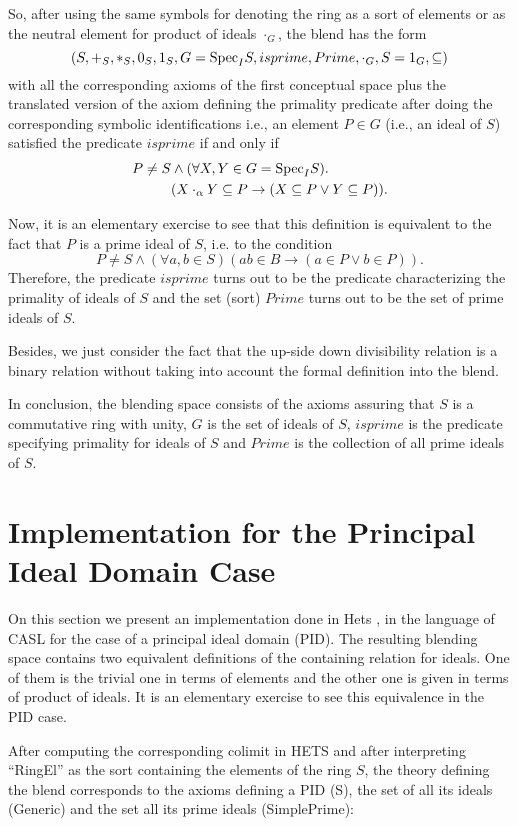 So, after using the same symbols for denoting the ring as a sort of elements or as the neutral element for product of ideals $\cdot_G$, the blend has the form
\[(S, +_S, *_S, 0_S, 1_S, G={\rm Spec}_IS, isprime, Prime, \cdot_G,
S=1_G, \subseteq)\] with all the corresponding axioms of the first
conceptual space plus the translated version of the axiom defining the
primality predicate after doing the corresponding symbolic
identifications i.e., an element $P \in G$ (i.e., an ideal of $S$)
satisfied the predicate $isprime$ if and only if
\begin{align*}
P\neq S & \wedge (\forall X,Y\in G={\rm Spec}_IS). \\
        & (X\cdot_{\alpha}Y\subseteq P \rightarrow (X\subseteq P \vee Y\subseteq P)).
\end{align*}

Now, it is an elementary exercise to see that this definition is
equivalent to the fact that $P$ is a prime ideal of $S$, i.e. to the
condition
\[ P\neq S \wedge (\forall a,b\in S)(ab\in B\rightarrow (a\in P \vee
b\in P)).\] Therefore, the predicate $isprime$ turns out to be the
predicate characterizing the primality of ideals of $S$ and the set
(sort) $Prime$ turns out to be the set of prime ideals of $S$.

Besides, we just consider the fact that the up-side down divisibility
relation is a binary relation without taking into account the formal
definition into the blend.

In conclusion, the blending space consists of the axioms assuring that
$S$ is a commutative ring with unity, $G$ is the set of ideals of $S$,
$isprime$ is the predicate specifying primality for ideals of $S$ and
$Prime$ is the collection of all prime ideals of $S$.
 
\section{Implementation for the Principal Ideal Domain Case}

On this section we present an implementation done in
Hets \parencite{Mossakowskihets}, in the language of CASL for the case
of a principal ideal domain (PID).  The resulting blending space
contains two equivalent definitions of the containing relation for
ideals. One of them is the trivial one in terms of elements and the
other one is given in terms of product of ideals. It is an elementary
exercise to see this equivalence in the PID case.



After computing the corresponding colimit in HETS and after
interpreting ``RingEl'' as the sort containing the elements of the ring
$S$, the theory defining the blend corresponds to the axioms defining
a PID (S), the set of all its ideals (Generic) and the set all its
prime ideals (SimplePrime):





